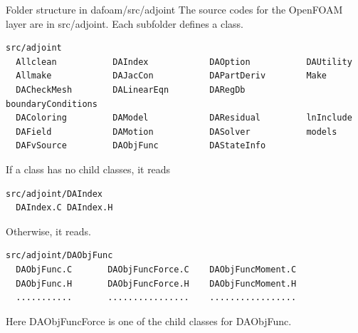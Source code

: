 \documentclass{bredelebeamer}
\begin{document}
\begin{frame}[fragile]{Folder structure in dafoam/src/adjoint}
The source codes for the OpenFOAM layer are in src/adjoint. Each subfolder defines a class.
\footnotesize
\lstset{ language=bash }
\begin{lstlisting}
src/adjoint
  Allclean           DAIndex            DAOption           DAUtility
  Allmake            DAJacCon           DAPartDeriv        Make
  DACheckMesh        DALinearEqn        DARegDb            boundaryConditions
  DAColoring         DAModel            DAResidual         lnInclude
  DAField            DAMotion           DASolver           models
  DAFvSource         DAObjFunc          DAStateInfo
\end{lstlisting}
\normalsize

If a class has no child classes, it reads
\footnotesize
\lstset{ language=bash }
\begin{lstlisting}
src/adjoint/DAIndex
  DAIndex.C DAIndex.H
\end{lstlisting}
\normalsize

Otherwise, it reads.
\footnotesize
\lstset{ language=bash }
\begin{lstlisting}
src/adjoint/DAObjFunc
  DAObjFunc.C       DAObjFuncForce.C    DAObjFuncMoment.C
  DAObjFunc.H       DAObjFuncForce.H    DAObjFuncMoment.H
  ...........       ................    .................
\end{lstlisting}
\normalsize

Here DAObjFuncForce is one of the child classes for DAObjFunc.

\end{frame}
\end{document}

